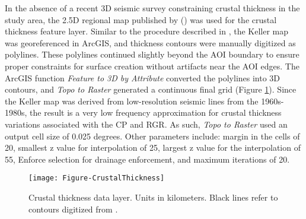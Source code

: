 In the absence of a recent 3D seismic survey constraining crustal thickness in the study area, the 2.5D regional map published by \citeauthor{keller_comparative_1991} (\citeyear{keller_comparative_1991}) was used for the crustal thickness feature layer. Similar to the procedure described in \citep{pepin_new_2018}, the Keller map was georeferenced in ArcGIS, and thickness contours were manually digitized as polylines. These polylines continued slightly beyond the AOI boundary to ensure proper constraints for surface creation without artifacts near the AOI edges. The ArcGIS function \textit{Feature to 3D by Attribute} converted the polylines into 3D contours, and \textit{Topo to Raster} generated a continuous final grid (Figure \ref{fig:feat_crust}). Since the Keller map was derived from low-resolution seismic lines from the 1960s-1980s, the result is a very low frequency approximation for crustal thickness variations associated with the CP and RGR. As such, \textit{Topo to Raster} used an output cell size of 0.025 degrees. Other parameters include: margin in the cells of 20, smallest z value for interpolation of 25, largest z value for the interpolation of 55, Enforce selection for drainage enforcement, and maximum iterations of 20.

\begin{figure}[!htp]
\centering
\texttt{[image: Figure-CrustalThickness]}
\caption[Crustal thickness data layer]{Crustal thickness data layer. Units in kilometers. Black lines refer to contours digitized from \protect\citep{keller_comparative_1991}.}
\label{fig:feat_crust}
\end{figure}
